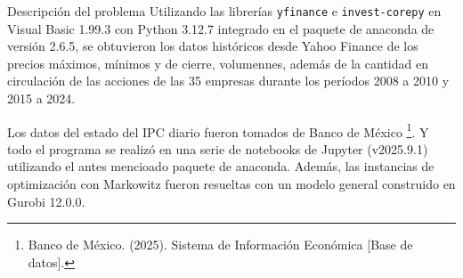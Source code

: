 \documentclass[aspectratio=169,xcolor=dvipsnames]{beamer}
\begin{document}
\begin{frame}{Descripción del problema}
    \quad Utilizando las librerías \texttt{yfinance} e \texttt{invest-corepy} en Visual Basic 1.99.3 con Python 3.12.7 
    integrado en el paquete de anaconda de versión 2.6.5, se obtuvieron los datos históricos desde Yahoo
    Finance de los precios máximos, mínimos y de cierre, volumennes, además de la cantidad en circulación 
    de las acciones de las 35 empresas durante los períodos 2008 a 2010 y 2015 a 2024.

    \quad Los datos del estado del IPC diario fueron tomados de Banco de México \footnote{Banco de México. 
    (2025). Sistema de Información Económica {[}Base de datos{]}.}. Y todo el programa se realizó en una
    serie de notebooks de Jupyter (v2025.9.1) utilizando el antes mencioado paquete de anaconda.
    Además, las instancias de optimización con Markowitz fueron resueltas con un modelo general construido en Gurobi 12.0.0.
\end{frame}
\end{document}
